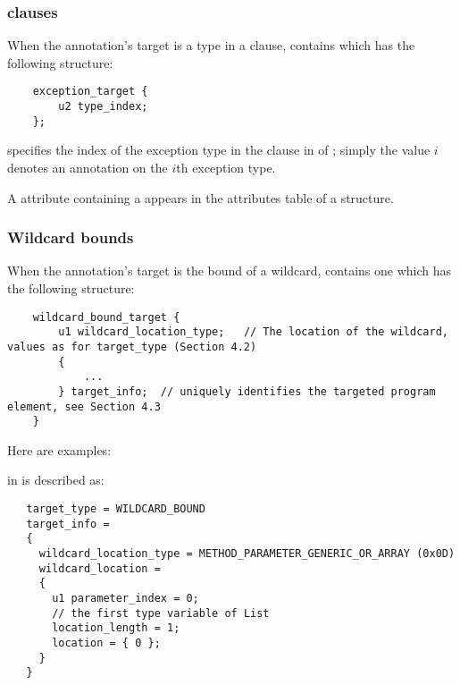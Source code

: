 \documentclass[10pt]{article}
\begin{document}
\subsubsection{ clauses\label{class-file:ext:ri:throws}}
When the annotation's target is a type in a  clause,
 contains  which has the
following structure:

\begin{Verbatim}
    exception_target {
        u2 type_index;
    };
\end{Verbatim}

 specifies the index of the exception type in the
clause in  of ;
simply the value $i$ denotes an annotation on the $i$th exception
type.

A \RuntimeInOrVisibleTypeAnnotations attribute containing a
 appears in the attributes table of a
 structure.


\subsubsection{Wildcard bounds\label{class-file:ext:ri:wildcard}}

When the annotation's target is the bound of a wildcard,
 contains one  which
has the following structure:

\begin{Verbatim}
    wildcard_bound_target {
        u1 wildcard_location_type;   // The location of the wildcard, values as for target_type (Section 4.2)
        {
            ...
        } target_info;  // uniquely identifies the targeted program element, see Section 4.3
    }
\end{Verbatim}

Here are examples:

\noindent
{} in  is described as:

\begin{Verbatim}
   target_type = WILDCARD_BOUND
   target_info =
   {
     wildcard_location_type = METHOD_PARAMETER_GENERIC_OR_ARRAY (0x0D)
     wildcard_location =
     {
       u1 parameter_index = 0;
       // the first type variable of List
       location_length = 1;
       location = { 0 };
     }
   }
\end{Verbatim}
\end{document}
